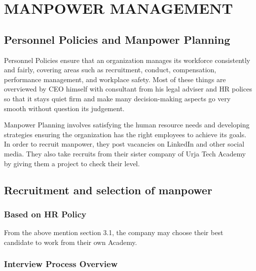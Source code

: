 
\chapter{MANPOWER MANAGEMENT}

\section{Personnel Policies and  Manpower Planning}
Personnel Policies ensure that an organization manages its workforce consistently and fairly, covering areas such as recruitment, conduct, compensation, performance management, and workplace safety. Most of these things are overviewed by CEO himself with consultant from his legal adviser and HR polices so that it stays quiet firm and make many decision-making aspects go very smooth without question its judgement.

Manpower Planning involves satisfying the human resource needs and developing strategies ensuring the organization has the right employees to achieve its goals. In order to recruit manpower, they post vacancies on LinkedIn and other social media. They also take recruits from their sister company of Urja Tech Academy by giving them a project to check their level. 

\section{Recruitment and selection of manpower}
\subsection{Based on HR Policy}

From the above mention section 3.1, the company may choose their best candidate to work from their own Academy.

\subsection{Interview Process Overview}

